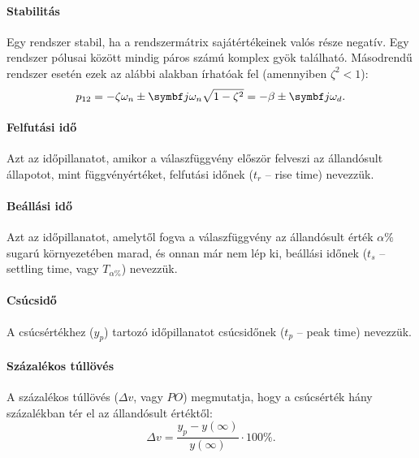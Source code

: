 \paragraph{Stabilitás}

Egy rendszer stabil, ha a rendszermátrix sajátértékeinek valós része negatív.
Egy rendszer pólusai között mindig páros számú komplex gyök található.
Másodrendű rendszer esetén ezek az alábbi alakban írhatóak fel (amennyiben
$\zeta^2 < 1$):
\begin{equation}
  p_{12}
  = -\zeta \omega_n \pm \iu \omega_n \sqrt{1 - \zeta^2}
  = -\beta \pm \iu \omega_d.
  \label{eq:complex-poles}
\end{equation}

\paragraph{Felfutási idő}

Azt az időpillanatot, amikor a válaszfüggvény először felveszi az állandósult
állapotot, mint függvényértéket, felfutási időnek ($t_r$ -- rise time) nevezzük.

\paragraph{Beállási idő}

Azt az időpillanatot, amelytől fogva a válaszfüggvény az állandósult érték
$\alpha\%$ sugarú környezetében marad, és onnan már nem lép ki, beállási időnek
($t_s$ -- settling time, vagy $T_{\alpha\%}$) nevezzük.

\paragraph{Csúcsidő}

A csúcsértékhez ($y_p$) tartozó időpillanatot csúcsidőnek ($t_p$ -- peak time)
nevezzük.

\paragraph{Százalékos túllövés}

A százalékos túllövés ($\Delta v$, vagy $\mathit{PO}$) megmutatja, hogy a
csúcsérték hány százalékban tér el az állandósult értéktől:
\begin{equation}
  \Delta v = \frac{y_p - y(\infty)}{y(\infty)} \cdot 100\%.
  \label{eq:PO}
\end{equation}

